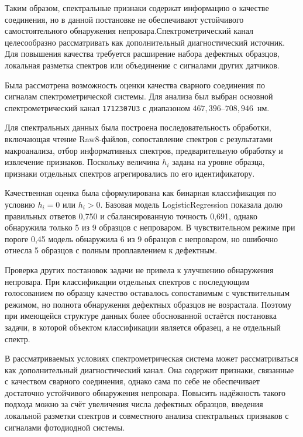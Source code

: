 Таким образом, спектральные признаки содержат информацию о качестве соединения, но в данной постановке не обеспечивают устойчивого самостоятельного обнаружения непровара.Спектрометрический канал целесообразно рассматривать как дополнительный диагностический источник. Для повышения качества требуется расширение набора дефектных образцов, локальная разметка спектров или объединение с сигналами других датчиков.

\chapterconclusion

Была рассмотрена возможность оценки качества сварного соединения по сигналам спектрометрической системы. Для анализа был выбран основной спектрометрический канал \texttt{1712307U3} с диапазоном \(467,396\)--\(708,946\)~нм.

Для спектральных данных была построена последовательность обработки, включающая чтение Raw8-файлов, сопоставление спектров с результатами макроанализа, отбор информативных спектров, предварительную обработку и извлечение признаков. Поскольку величина \(h_i\) задана на уровне образца, признаки отдельных спектров агрегировались по его идентификатору.

Качественная оценка была сформулирована как бинарная классификация по условию \(h_i = 0\) или \(h_i > 0\). Базовая модель LogisticRegression показала долю правильных ответов 0,750 и сбалансированную точность 0,691, однако обнаружила только 5 из 9 образцов с непроваром. В чувствительном режиме при пороге 0,45 модель обнаружила 6 из 9 образцов с непроваром, но ошибочно отнесла 5 образцов с полным проплавлением к дефектным.

Проверка других постановок задачи не привела к улучшению обнаружения непровара. При классификации отдельных спектров с последующим голосованием по образцу качество оставалось сопоставимым с чувствительным режимом, но полнота обнаружения дефектных образцов не возрастала. Поэтому при имеющейся структуре данных более обоснованной остаётся постановка задачи, в которой объектом классификации является образец, а не отдельный спектр.

В рассматриваемых условиях спектрометрическая система может рассматриваться как дополнительный диагностический канал. Она содержит признаки, связанные с качеством сварного соединения, однако сама по себе не обеспечивает достаточно устойчивого обнаружения непровара. Повысить надёжность такого подхода можно за счёт увеличения числа дефектных образцов, введения локальной разметки спектров и совместного анализа спектральных признаков с сигналами фотодиодной системы.

\endinput